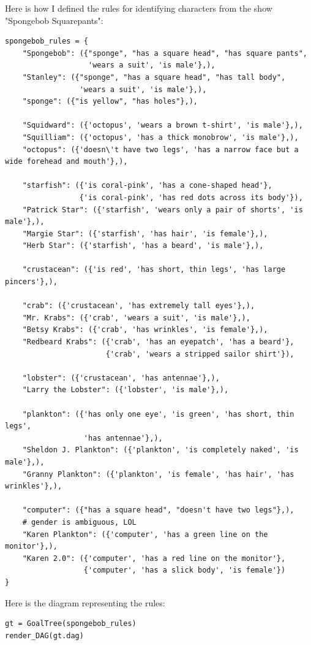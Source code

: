 \documentclass[11pt]{article}
\begin{document}
Here is how I defined the rules for identifying characters from the show "Spongebob Squarepants":
\begin{verbatim}
spongebob_rules = {
    "Spongebob": ({"sponge", "has a square head", "has square pants",
                   'wears a suit', 'is male'},),
    "Stanley": ({"sponge", "has a square head", "has tall body",
                 'wears a suit', 'is male'},),
    "sponge": ({"is yellow", "has holes"},),

    "Squidward": ({'octopus', 'wears a brown t-shirt', 'is male'},),
    "Squilliam": ({'octopus', 'has a thick monobrow', 'is male'},),
    "octopus": ({'doesn\'t have two legs', 'has a narrow face but a wide forehead and mouth'},),

    "starfish": ({'is coral-pink', 'has a cone-shaped head'},
                 {'is coral-pink', 'has red dots across its body'}),
    "Patrick Star": ({'starfish', 'wears only a pair of shorts', 'is male'},),
    "Margie Star": ({'starfish', 'has hair', 'is female'},),
    "Herb Star": ({'starfish', 'has a beard', 'is male'},),

    "crustacean": ({'is red', 'has short, thin legs', 'has large pincers'},),

    "crab": ({'crustacean', 'has extremely tall eyes'},),
    "Mr. Krabs": ({'crab', 'wears a suit', 'is male'},),
    "Betsy Krabs": ({'crab', 'has wrinkles', 'is female'},),
    "Redbeard Krabs": ({'crab', 'has an eyepatch', 'has a beard'},
                       {'crab', 'wears a stripped sailor shirt'}),

    "lobster": ({'crustacean', 'has antennae'},),
    "Larry the Lobster": ({'lobster', 'is male'},),

    "plankton": ({'has only one eye', 'is green', 'has short, thin legs',
                  'has antennae'},),
    "Sheldon J. Plankton": ({'plankton', 'is completely naked', 'is male'},),
    "Granny Plankton": ({'plankton', 'is female', 'has hair', 'has wrinkles'},),

    "computer": ({"has a square head", "doesn't have two legs"},),
    # gender is ambiguous, LOL
    "Karen Plankton": ({'computer', 'has a green line on the monitor'},),
    "Karen 2.0": ({'computer', 'has a red line on the monitor'},
                  {'computer', 'has a slick body', 'is female'})
}
\end{verbatim}

Here is the diagram representing the rules:
\begin{verbatim}
gt = GoalTree(spongebob_rules)
render_DAG(gt.dag)
\end{verbatim}
\end{document}
